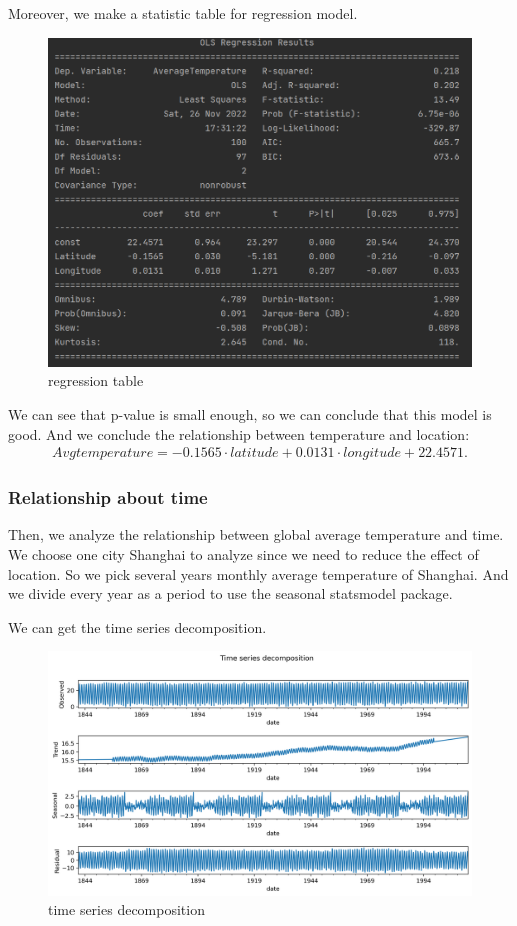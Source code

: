 \documentclass{apmcmthesis}
\begin{document}
Moreover, we make a statistic table for regression model.

\begin{figure}[htbp]
  \centering
  \includegraphics[scale=0.52]{2a table.png}
  \caption{regression table}
\end{figure}

We can see that p-value is small enough, so we can conclude that this model is good.
And we conclude the relationship between temperature and location:
\begin{align*}
  Avgtemperature =-0.1565\cdot latitude+0.0131\cdot longitude + 22.4571.
\end{align*}

\subsubsection{Relationship about time}
Then, we analyze the relationship between global average temperature and time.
We choose one city Shanghai to analyze since we need to reduce the effect of location.
So we pick several years monthly average temperature of Shanghai.
And we divide every year as a period to use the seasonal statsmodel package.

We can get the time series decomposition.

\begin{figure}[htbp]
  \centering
  \includegraphics[scale=0.5]{seasonal.png}
  \caption{time series decomposition}
\end{figure}
\end{document}

